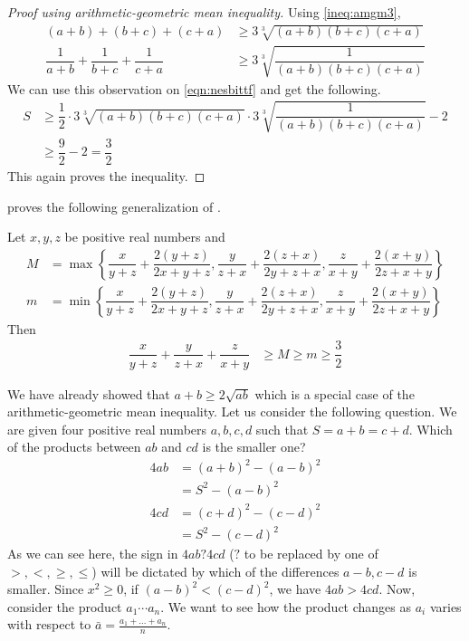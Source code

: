 \documentclass{subfile}
\begin{document}
		\begin{proof}[\itshape Proof using arithmetic-geometric mean inequality]
			Using \ref{ineq:amgm3},
				\begin{align*}
					(a+b)+(b+c)+(c+a)
						& \geq3\sqrt[3]{(a+b)(b+c)(c+a)}\\
					\dfrac{1}{a+b}+\dfrac{1}{b+c}+\dfrac{1}{c+a}
						& \geq3\sqrt[3]{\dfrac{1}{(a+b)(b+c)(c+a)}}
				\end{align*}
			We can use this observation on \ref{eqn:nesbittf} and get the following.
				\begin{align*}
					S
						& \geq\dfrac{1}{2}\cdot3\sqrt[3]{(a+b)(b+c)(c+a)}\cdot3\sqrt[3]{\dfrac{1}{(a+b)(b+c)(c+a)}}-2\\
						& \geq\dfrac{9}{2}-2=\dfrac{3}{2}
				\end{align*}
			This again proves the inequality.
		\end{proof}
	\textcite{anovic_pecaric_2011} proves the following generalization of .
		\begin{theorem}
			Let $x,y,z$ be positive real numbers and
				\begin{align*}
					M
						& = \max\left\{\dfrac{x}{y+z}+\dfrac{2(y+z)}{2x+y+z},\dfrac{y}{z+x}+\dfrac{2(z+x)}{2y+z+x},\dfrac{z}{x+y}+\dfrac{2(x+y)}{2z+x+y}\right\}\\
					m
						& =  \min\left\{\dfrac{x}{y+z}+\dfrac{2(y+z)}{2x+y+z},\dfrac{y}{z+x}+\dfrac{2(z+x)}{2y+z+x},\dfrac{z}{x+y}+\dfrac{2(x+y)}{2z+x+y}\right\}
				\end{align*}
			Then
				\begin{align*}
					\dfrac{x}{y+z}+\dfrac{y}{z+x}+\dfrac{z}{x+y}
						& \geq M\geq m\geq \dfrac{3}{2}
				\end{align*}
		\end{theorem}
	We have already showed that $a+b\geq2\sqrt{ab}$ which is a special case of the arithmetic-geometric mean inequality. Let us consider the following question. We are given four positive real numbers $a,b,c,d$ such that $S=a+b=c+d$. Which of the products between $ab$ and $cd$ is the smaller one?
		\begin{align*}
			4ab
				& = (a+b)^2-(a-b)^2\\
				& = S^2-(a-b)^2\\
			4cd
				& = (c+d)^2-(c-d)^2\\
				& = S^2-(c-d)^2
		\end{align*}
	As we can see here, the sign in $4ab?4cd$ ($?$ to be replaced by one of $>,<,\geq,\leq$) will be dictated by which of the differences $a-b,c-d$ is smaller. Since $x^2\geq0$, if $(a-b)^2<(c-d)^2$, we have $4ab>4cd$. Now, consider the product $a_1\cdots a_n$. We want to see how the product changes as $a_i$ varies with respect to $\bar{a}=\frac{a_1+\ldots+a_n}{n}$.
	
\end{document}
